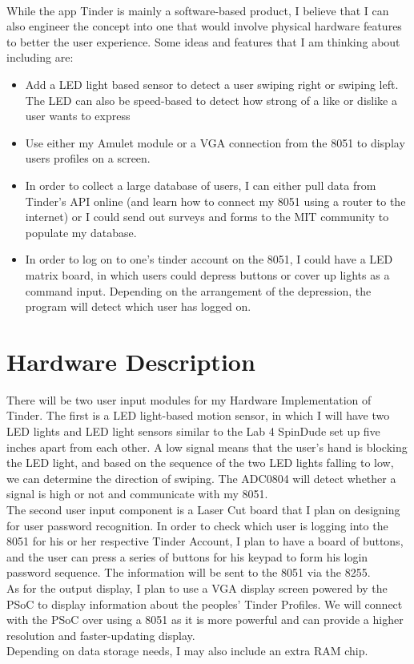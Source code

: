 \documentclass[12pt,twoside]{article}
\begin{document}
\\ While the app Tinder is mainly a software-based product, I believe that I can also engineer the concept into one that would involve physical hardware features to better the user experience. Some ideas and features that I am thinking about including are:
\begin{itemize}
\item Add a LED light based sensor to detect a user swiping right or swiping left. The LED can also be speed-based to detect how strong of a like or dislike a user wants to express
\item Use either my Amulet module or a VGA connection from the 8051 to display users profiles on a screen. 
\item In order to collect a large database of users, I can either pull data from Tinder's API online (and learn how to connect my 8051 using a router to the internet) or I could send out surveys and forms to the MIT community to populate my database. 
\item In order to log on to one's tinder account on the 8051, I could have a LED matrix board, in which users could depress buttons or cover up lights as a command input. Depending on the arrangement of the depression, the program will detect which user has logged on. 
\end{itemize}


\section{Hardware Description}

There will be two user input modules for my Hardware Implementation of Tinder. The first is a LED light-based motion sensor, in which I will have two LED lights and LED light sensors similar to the Lab 4 SpinDude set up five inches apart from each other. A low signal means that the user's hand is blocking the LED light, and based on the sequence of the two LED lights falling to low, we can determine the direction of swiping. The ADC0804 will detect whether a signal is high or not and communicate with my 8051.
\\ The second user input component is a Laser Cut board that I plan on designing for user password recognition. In order to check which user is logging into the 8051 for his or her respective Tinder Account, I plan to have a board of buttons, and the user can press a series of buttons for his keypad to form his login password sequence. The information will be sent to the 8051 via the 8255.
\\ As for the output display, I plan to use a VGA display screen powered by the PSoC to display information about the peoples' Tinder Profiles. We will connect with the PSoC over using a 8051 as it is more powerful and can provide a higher resolution and faster-updating display. 
\\ Depending on data storage needs, I may also include an extra RAM chip. 
\end{document}
